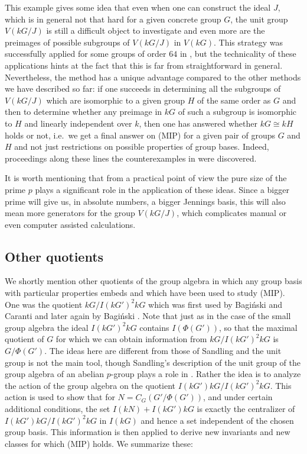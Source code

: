 \documentclass[11pt, a4paper]{amsart}
\theoremstyle{definition}
\begin{document}
This example gives some idea that even when one can construct the ideal $J$, which is in general not that hard for a given concrete group $G$, the unit group $V(kG/J)$ is still a difficult object to investigate and even more are the preimages of possible subgroups of $V(kG/J)$ in $V(kG)$. This strategy was successfully applied for some groups of order $64$ in \cite{HertweckSoriano06}, but the technicality of these applications hints at the fact that this is far from straightforward in general. Nevertheless, the method has a unique advantage compared to the other methods we have described so far: if one succeeds in determining all the subgroups of $V(kG/J)$ which are isomorphic to a given group $H$ of the same order as $G$ and then to determine whether any preimage in $kG$ of such a subgroup is isomorphic to $H$ and linearly independent over $k$, then one has answered whether $kG \cong kH$ holds or not, i.e.\ we get a final answer on (MIP) for a given pair of groups $G$ and $H$ and not just restrictions on possible properties of group bases. Indeed, proceedings along these lines the counterexamples in \cite{GarciaLucasMargolisDelRioCounterexample} were discovered.

It is worth mentioning that from a practical point of view the pure size of the prime $p$ plays a significant role in the application of these ideas. Since a bigger prime will give us, in absolute numbers, a bigger Jennings basis, this will also mean more generators for the group $V(kG/J)$, which complicates manual or even computer assisted calculations.

\subsection{Other quotients}

We shortly mention other quotients of the group algebra in which any group basis with particular properties embeds and which have been used to study (MIP). One was the quotient $kG/I(kG')^2 kG$ which was first used by Bagi\'nski and Caranti \cite{BaginskiCaranti88} and later again by Bagi\'nski \cite{Baginski99}. Note that just as in the case of the small group algebra the ideal $I(kG')^2kG$ contains $I(\Phi(G'))$, so that the maximal quotient of $G$ for which we can obtain information from $kG/I(kG')^2 kG$ is $G/\Phi(G')$. The ideas here are different from those of Sandling and the unit group is not the main tool, though Sandling's description of the unit group of the group algebra of an abelian $p$-group plays a role in \cite{Baginski99}. Rather the idea is to analyze the action of the group algebra on the quotient $I(kG')kG/I(kG')^2kG$. This action is used to show that for $N = C_G(G'/\Phi(G'))$, and under certain additional conditions, the set $I(kN) + I(kG')kG$ is exactly the centralizer of $I(kG')kG/I(kG')^2kG$ in $I(kG)$ and hence a set independent of the chosen group basis. This information is then applied to derive new invariants and new classes for which (MIP) holds. We summarize these:
\end{document}
